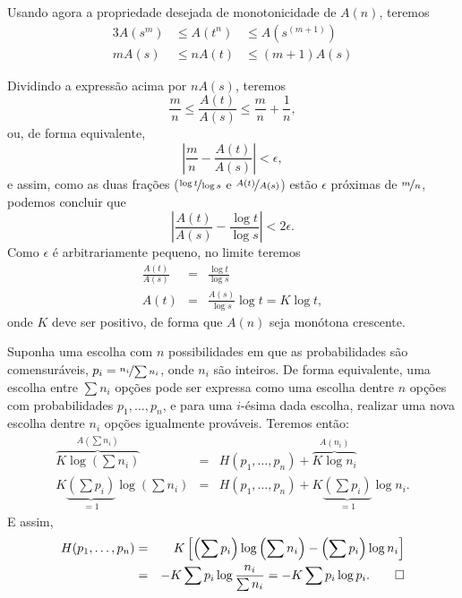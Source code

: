 \begin{frame}[allowframebreaks]
  Usando agora a propriedade desejada de monotonicidade de $A(n)$, teremos
  \begin{alignat}{3}
  A(s^m) &\leq A(t^n) &\leq A(s^{(m+1)}) \nonumber \\
  mA(s) &\leq nA(t) &\leq (m+1)A(s)
  \end{alignat}

  Dividindo a expressão acima por $nA(s)$, teremos
  \begin{equation}
  \frac{m}{n} \leq \frac{A(t)}{A(s)} \leq \frac{m}{n} + \frac{1}{n} ,
  \end{equation}
  ou, de forma equivalente,
  \begin{equation}
  \left\vert \frac{m}{n} - \frac{A(t)}{A(s)} \right\vert < \epsilon ,
  \end{equation}
  e assim, como as duas frações ($\nicefrac{\log t}{\log s}$ e $\nicefrac{A(t)}{A(s)}$) estão $\epsilon$ próximas
  de $\nicefrac{m}{n}$, podemos concluir que
  \begin{equation}
  \left\vert \frac{A(t)}{A(s)} - \frac{\log t}{\log s} \right\vert < 2\epsilon .
  \end{equation}
  Como $\epsilon$ é arbitrariamente pequeno, no limite teremos
  \begin{eqnarray}
  \frac{A(t)}{A(s)} &=& \frac{\log t}{\log s} \nonumber \\
  A(t) &=& \frac{A(s)}{\log s} \log t = K \log t ,
  \end{eqnarray}
  onde $K$ deve ser positivo, de forma que $A(n)$ seja monótona crescente.

  Suponha uma escolha com $n$ possibilidades em que as probabilidades são comensuráveis,
  $p_i = \nicefrac{n_i}{\sum n_i}$, onde $n_i$ são inteiros. De forma equivalente,
  uma escolha entre $\sum n_i$ opções pode ser expressa como uma escolha dentre $n$ opções
  com probabilidades $p_1, \ldots, p_n$, e para uma $i$-ésima dada escolha, realizar uma
  nova escolha dentre $n_i$ opções igualmente prováveis. Teremos então:
  \begin{eqnarray}
  \overbrace{ K \log \left( \sum n_i \right) }^{A\left( \sum n_i \right)} &=& H(p_1, \ldots, p_n) + \overbrace{ K \log n_i }^{A(n_i)} \nonumber \\
  K \underbrace{\left( \sum p_i \right)}_{=1} \log \left( \sum n_i \right) &=& H(p_1, \ldots, p_n) + K \underbrace{\left( \sum p_i \right)}_{=1} \log n_i .
  \end{eqnarray}  
  E assim,
  \begin{eqnarray}
  H(p_1, \ldots, p_n) &=& K\left[ \left( \sum p_i \right) \log \left( \sum n_i \right) - \left( \sum p_i \right) \log n_i \right] \nonumber \\
        &=& -K \sum p_i \log \frac{n_i}{\sum n_i} = -K \sum p_i \log p_i . \qed
  \end{eqnarray} 
\end{frame}


